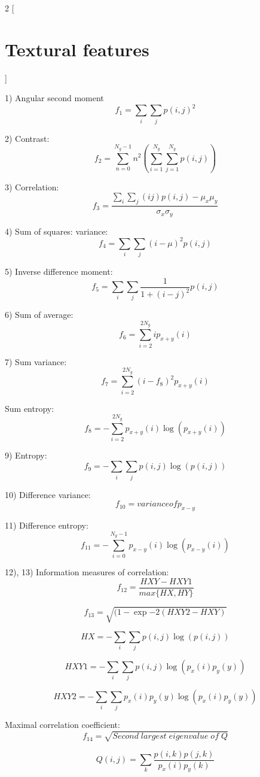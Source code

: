 \documentclass[8pt]{article}
\begin{document}
\begin{multicols}{2}
[
\section{Textural features}
]

1) Angular second moment
\[
f_1 = \sum_{i}\sum_{j}p(i,j)^2
\]

2) Contrast: 
\[
f_2 = \sum_{n=0}^{N_g-1}n^2 \left( \sum_{i=1}^{N_g}\sum_{j=1}^{N_g}p(i,j) \right)
\]

3) Correlation:
\[
f_3 = \frac{\sum_i\sum_j\left(ij\right)p(i,j) - \mu_x\mu_y}{\sigma_x\sigma_y}
\]

4) Sum of squares: variance: 
\[
f_4 = \sum_i\sum_j(i-\mu)^2p(i,j)
\]

5) Inverse difference moment:
\[
f_5 = \sum_i\sum_j \frac{1}{1+(i-j)^2}p(i,j)
\]

6) Sum of average:
\[
f_6 = \sum_{i=2}^{2N_g}ip_{x+y}(i)
\]

7) Sum variance: 
\[
f_7 = \sum_{i=2}^{2N_g}(i-f_8)^2p_{x+y}(i)
\]

Sum entropy: 
\[
f_8 = -\sum_{i=2}^{2N_g}p_{x+y}(i)\log(p_{x+y}(i))
\]

9) Entropy:
\[
f_9 = -\sum_i\sum_j p(i,j)\log(p(i,j))
\]

10) Difference variance:
\[
f_{10} = variance of p_{x-y}
\]

11) Difference entropy: 
\[
f_{11} = -\sum_{i=0}^{N_g-1}p_{x-y}(i)\log(p_{x-y}(i)) 
\]

12), 13) Information measures of correlation:
\[
f_{12} = \frac{HXY - HXY1}{max\{HX,HY\}}
\]

\[
f_{13} = \sqrt{(1-\exp{-2(HXY2 - HXY)}}
\]

\[
HX = -\sum_i\sum_j p(i,j)\log(p(i,j))
\]

\[
HXY1 = -\sum_i\sum_j p(i,j)\log(p_x(i)p_y(y))
\]

\[
HXY2 = -\sum_i\sum_j p_x(i)p_y(y) \log(p_x(i)p_y(y))
\]

Maximal correlation coefficient:
\[
f_{14} = \sqrt{Second \; largest \; eigenvalue \; of \; Q}
\]

\[
Q(i,j) = \sum_k \frac{p(i,k)p(j,k)}{p_x(i)p_y(k)}
\]

\end{multicols}
\end{document}
